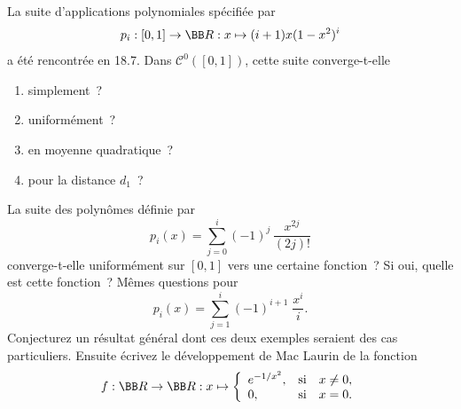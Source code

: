 \documentclass[12pt,french,oneside,a4paper]{memoir} %
\begin{document}
\begin{exo}
La suite d'applications polynomiales spécifiée par
$$
p_i : [0,1] \rightarrow {\BB R} : x \mapsto (i+1) x(1-x^2)^i
$$
a été rencontrée en 18.7. Dans $\mathcal{C}^0([0,1])$, cette suite converge-t-elle
\begin{enumerate}
\item simplement~?
\item uniformément~? 
\item en moyenne quadratique~?
\item pour la distance $d_1$~? 
\end{enumerate}
\end{exo}
\begin{exo}
La suite des polynômes définie par
$$
p_i(x)=\sum_{j=0}^i (-1)^j \, \frac{x^{2j}}{(2j)!}
$$
converge-t-elle uniformément sur $[0,1]$ vers une certaine fonction~? Si oui,
quelle est cette fonction~? Mêmes questions pour 
$$
p_i(x) = \sum_{j=1}^i (-1)^{i+1} \; \frac{x^i}{i}.
$$
Conjecturez un résultat général dont ces deux exemples seraient des cas
particuliers. Ensuite écrivez le développement de Mac Laurin de la fonction
$$
f : {\BB R} \rightarrow {\BB R} : x \mapsto \left\{
\begin{array}{ll}
e^{-1/x^2}, & \mbox{si} \quad x \neq 0, \\
0, &\mbox{si} \quad x=0.
\end{array}
\right.
$$
\end{exo}
\end{document}

